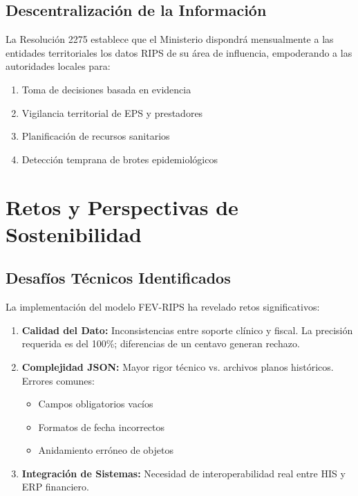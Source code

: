 \documentclass[12pt,letterpaper]{report}
\begin{document}
\subsection{Descentralización de la Información}

La Resolución 2275 establece que el Ministerio dispondrá mensualmente a las entidades territoriales los datos RIPS de su área de influencia, empoderando a las autoridades locales para:

\begin{enumerate}
    \item Toma de decisiones basada en evidencia
    \item Vigilancia territorial de EPS y prestadores
    \item Planificación de recursos sanitarios
    \item Detección temprana de brotes epidemiológicos
\end{enumerate}

\section{Retos y Perspectivas de Sostenibilidad}

\subsection{Desafíos Técnicos Identificados}

La implementación del modelo FEV-RIPS ha revelado retos significativos:

\begin{enumerate}
    \item \textbf{Calidad del Dato:} Inconsistencias entre soporte clínico y fiscal. La precisión requerida es del 100\%; diferencias de un centavo generan rechazo.
    
    \item \textbf{Complejidad JSON:} Mayor rigor técnico vs. archivos planos históricos. Errores comunes:
    \begin{itemize}
        \item Campos obligatorios vacíos
        \item Formatos de fecha incorrectos
        \item Anidamiento erróneo de objetos
    \end{itemize}
    
    \item \textbf{Integración de Sistemas:} Necesidad de interoperabilidad real entre HIS y ERP financiero.
\end{enumerate}
\end{document}
